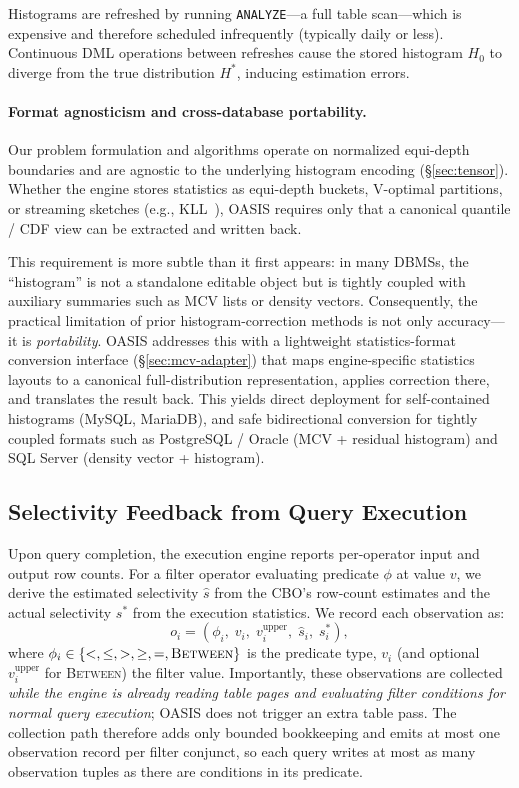 \documentclass[runningheads]{llncs}
\begin{document}
Histograms are refreshed by running \texttt{ANALYZE}—a full table scan—which
is expensive and therefore scheduled infrequently (typically daily or less).
Continuous DML operations between refreshes cause the stored histogram $H_0$
to diverge from the true distribution $H^*$, inducing estimation errors.
\paragraph{Format agnosticism and cross-database portability.}
Our problem formulation and algorithms operate on normalized equi-depth
boundaries and are agnostic to the underlying histogram encoding
(\S\ref{sec:tensor}). Whether the engine stores statistics as equi-depth
buckets, V-optimal partitions, or streaming sketches (e.g.,
KLL~\cite{ivkin2019kll}), OASIS requires only that a canonical quantile / CDF
view can be extracted and written back.

This requirement is more subtle than it first appears: in many DBMSs, the
``histogram'' is not a standalone editable object but is tightly coupled with
auxiliary summaries such as MCV lists or density vectors. Consequently, the
practical limitation of prior histogram-correction methods is not only
accuracy---it is \emph{portability}. OASIS addresses this with a lightweight
statistics-format conversion interface (\S\ref{sec:mcv-adapter}) that maps
engine-specific statistics layouts to a canonical full-distribution
representation, applies correction there, and translates the result back.
This yields direct deployment for self-contained histograms (MySQL, MariaDB),
and safe bidirectional conversion for tightly coupled formats such as
PostgreSQL / Oracle (MCV + residual histogram) and SQL Server (density vector +
histogram).

\subsection{Selectivity Feedback from Query Execution}

Upon query completion, the execution engine reports per-operator input and
output row counts.
For a filter operator evaluating predicate $\phi$ at value $v$, we derive
the estimated selectivity $\hat{s}$ from the CBO's row-count estimates and
the actual selectivity $s^*$ from the execution statistics.
We record each observation as:
\[
  o_i = (\phi_i,\; v_i,\; v_i^{\text{upper}},\;
         \hat{s}_i,\; s^*_i),
\]
where $\phi_i \in
\{<, \leq, >, \geq, =, \textsc{Between}\}$ is the predicate type,
$v_i$ (and optional $v_i^{\text{upper}}$ for \textsc{Between}) the filter
value. Importantly, these observations are collected \emph{while the engine is
already reading table pages and evaluating filter conditions for normal query
execution}; OASIS does not trigger an extra table pass. The collection path
therefore adds only bounded bookkeeping and emits at most one observation record
per filter conjunct, so each query writes at most as many observation tuples as
there are conditions in its predicate.
\end{document}

